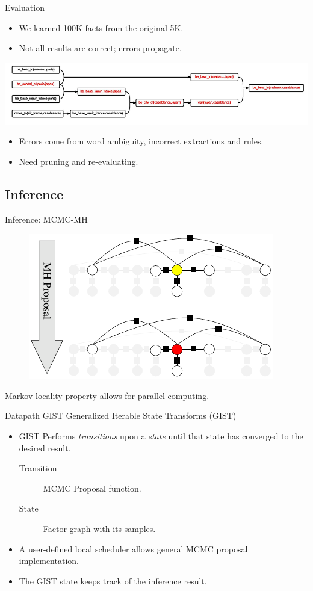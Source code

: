 \documentclass[onlymath,xcolor=pdftex,dvipsnames,table]{beamer}
\newcommand{\gist}{\textsc{GIST}\xspace}
\let\oldemph\emph
\renewcommand{\emph}[1]{{\color{Blue}\oldemph{#1}}}
\newcommand{\head}[1]{{\large\color{OliveGreen}#1\\[2pt]}}
\begin{document}
\begin{frame}{Evaluation}
\begin{itemize}
  \item We learned 100K facts from the original 5K.
  \item Not all results are correct; errors propagate.
\end{itemize}
\includegraphics[width=\textwidth]{error.png}
\begin{itemize}
  \item Errors come from word ambiguity, incorrect extractions and
    rules.
  \item Need pruning and re-evaluating.
\end{itemize}
\end{frame}


\subsection{Inference}
\begin{frame}{Inference: MCMC-MH}
\begin{figure}
  \centering
  \includegraphics[width=.5\textwidth]{mcmc.pdf}
\end{figure}
Markov locality property allows for parallel computing.
\end{frame}


\begin{frame}{Datapath \gist}
\head{Generalized Iterable State Transforms (GIST)}
\begin{itemize}
  \item GIST Performs \emph{transitions} upon a \emph{state} until that
    state has converged to the desired result.
  \begin{description}
    \item[Transition] MCMC Proposal function.
    \item[State] Factor graph with its samples.
  \end{description}
  \item A user-defined local scheduler allows general MCMC proposal implementation.
  \item The GIST state keeps track of the inference result.
\end{itemize}
\end{frame}
\end{document}
